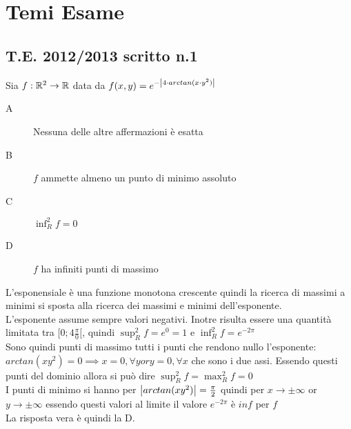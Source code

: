 \chapter{Temi Esame}
\section{T.E. 2012/2013 scritto n.1}
\begin{exercise}
	Sia $f: \mathbb{R}^2 \to \mathbb{R}$ data da $f(x, y)=e^{-\left|4\cdot arctan(x\cdot y^2)\right|}$
	\begin{description}
		\item[A] Nessuna delle altre affermazioni è esatta
		\item[B] $f$ ammette almeno un punto di minimo assoluto
		\item[C] $\inf_R^2f = 0$
		\item[D] $f$ ha infiniti punti di massimo
	\end{description}
	L'esponensiale è una funzione monotona crescente quindi la ricerca di massimi a minimi si sposta alla ricerca dei massimi e minimi dell'esponente.\\
	L'esponente assume sempre valori negativi. Inotre risulta essere una quantità limitata tra $[0;4\frac{\pi}{0}[$, quindi $\sup_R^2f=e^0=1$ e $\inf_R^2f=e^{-2\pi}$\\
	Sono quindi punti di massimo tutti i punti che rendono nullo l'esponente: $arctan(xy^2)=0 \implies x=0,\forall y or y=0,\forall x$ che sono i due assi. Essendo questi punti del dominio allora si può dire $\sup_R^2f=\max_R^2f=0$\\
	I punti di minimo si hanno per $\left|arctan(xy^2)\right|=\frac{\pi}{2}$ quindi per $x \to \pm\infty$ or $y \to \pm\infty$ essendo questi valori al limite il valore $e^{-2\pi}$ è $inf$ per $f$\\
	La risposta vera è quindi la D.\\
\end{exercise}
